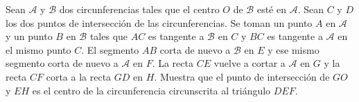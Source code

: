 Sean $\mathcal{A}$ y $\mathcal{B}$ dos circunferencias tales que el centro $O$ de $\mathcal{B}$ esté en $\mathcal{A}$. Sean $C$ y $D$ los dos puntos de intersección de las circunferencias. Se toman un punto $A$ en $\mathcal{A}$ y un punto $B$ en $\mathcal{B}$ tales que $AC$ es tangente a $\mathcal{B}$ en $C$ y $BC$ es tangente a $\mathcal{A}$ en el mismo punto $C$. El segmento $AB$ corta de nuevo a $\mathcal{B}$ en $E$ y ese mismo segmento corta de nuevo a $\mathcal{A}$ en $F$. La recta $CE$ vuelve a cortar a $\mathcal{A}$ en $G$ y la recta $CF$ corta a la recta $GD$ en $H$. Muestra que el punto de intersección de $GO$ y $EH$ es el centro de la circunferencia circunscrita al triángulo $DEF$.
